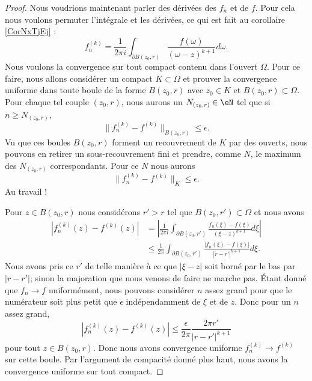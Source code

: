 \begin{proof}
    Nous voudrions maintenant parler des dérivées des \( f_n\) et de \( f\). Pour cela nous voulons permuter l'intégrale et les dérivées, ce qui est fait au corollaire \ref{CorNxTjEj} :
    \begin{equation}
        f_n^{(k)}=\frac{1}{ 2\pi i }\int_{\partial B(z_0,r)}\frac{ f(\omega) }{ (\omega-z)^{k+1} }d\omega.
    \end{equation}
    Nous voulons la convergence sur tout compact contenu dans l'ouvert \( \Omega\). Pour ce faire, nous allons considérer un compact \( K\subset \Omega\) et prouver la convergence uniforme dans toute boule de la forme \( B(z_0,r)\) avec \( z_0\in K\) et \( B(z_0,r)\subset \Omega\). Pour chaque tel couple \( (z_0,r)\), nous aurons un \( N_{(z_0,r)}\in \eN\) tel que si \( n\geq N_{(z_0,r)}\),
    \begin{equation}
        \| f_n^{(k)}-f^{(k)} \|_{B(z_0,r)}\leq \epsilon.
    \end{equation}
    Vu que ces boules \( B(z_0,r)\) forment un recouvrement de \( K\) par des ouverts, nous pouvons en retirer un sous-recouvrement fini et prendre, comme \( N\), le maximum des \( N_{(z_0,r)}\) correspondants. Pour ce \( N\) nous aurons
    \begin{equation}
        \| f_n^{(k)}-f^{(k)} \|_K\leq \epsilon.
    \end{equation}
    Au travail !

    Pour \( z\in B(z_0,r)\) nous considérons \( r'>r\) tel que \( B(z_0,r')\subset \Omega\) et nous avons
    \begin{subequations}
        \begin{align}
            | f^{(k)}_n(z)-f^{(k)}(z) |&=\left| \frac{1}{ 2\pi i }\int_{\partial B(z_0,r')}\frac{ f_n(\xi)-f(\xi) }{ (\xi-z)^{k+1} }d\xi \right| \\
            &\leq\frac{1}{ 2\pi }\int_{\partial B(z_0,r')}\frac{ | f_n(\xi)-f(\xi) | }{ | r-r' |^{k+1} }d\xi.
        \end{align}
    \end{subequations}
    Nous avons pris ce \( r'\) de telle manière à ce que \( | \xi-z |\) soit borné par le bas par \( | r-r' |\); sinon la majoration que nous venons de faire ne marche pas. Étant donné que \( f_n\to f\) uniformément, nous pouvons considérer \( n\) assez grand pour que le numérateur soit plus petit que \( \epsilon\) indépendamment de \( \xi\) et de \( z\). Donc pour un \( n\) assez grand,
    \begin{equation}
        | f^{(k)}_n(z)-f^{(k)}(z) |\leq \frac{ \epsilon }{ 2\pi }\frac{ 2\pi r' }{ | r-r' |^{k+1} }
    \end{equation}
    pour tout \( z\in B(z_0,r)\). Donc nous avons convergence uniforme \( f_n^{(k)}\to f^{(k)}\) sur cette boule. Par l'argument de compacité donné plus haut, nous avons la convergence uniforme sur tout compact.

\end{proof}
